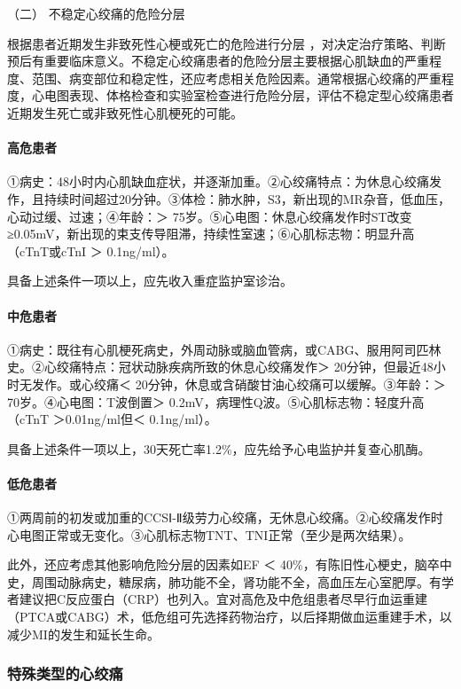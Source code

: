 \hypertarget{text00309.htmlux5cux23CHP10-7-2-5-2}{}
（二） 不稳定心绞痛的危险分层

根据患者近期发生非致死性心梗或死亡的危险进行分层
，对决定治疗策略、判断预后有重要临床意义。不稳定心绞痛患者的危险分层主要根据心肌缺血的严重程度、范围、病变部位和稳定性，还应考虑相关危险因素。通常根据心绞痛的严重程度，心电图表现、体格检查和实验室检查进行危险分层，评估不稳定型心绞痛患者近期发生死亡或非致死性心肌梗死的可能。

\paragraph{高危患者}

①病史：48小时内心肌缺血症状，并逐渐加重。②心绞痛特点：为休息心绞痛发作，且持续时间超过20分钟。③体检：肺水肿，S3，新出现的MR杂音，低血压，心动过缓、过速；④年龄：＞
75岁。⑤心电图：休息心绞痛发作时ST改变≥0.05mV，新出现的束支传导阻滞，持续性室速；⑥心肌标志物：明显升高（cTnT或cTnI
＞ 0.1ng/ml）。

具备上述条件一项以上，应先收入重症监护室诊治。

\paragraph{中危患者}

①病史：既往有心肌梗死病史，外周动脉或脑血管病，或CABG、服用阿司匹林史。②心绞痛特点：冠状动脉疾病所致的休息心绞痛发作＞
20分钟，但最近48小时无发作。或心绞痛＜
20分钟，休息或含硝酸甘油心绞痛可以缓解。③年龄：＞
70岁。④心电图：T波倒置＞ 0.2mV，病理性Q波。⑤心肌标志物：轻度升高（cTnT
＞0.01ng/ml但＜ 0.1ng/ml）。

具备上述条件一项以上，30天死亡率1.2\%，应先给予心电监护并复查心肌酶。

\paragraph{低危患者}

①两周前的初发或加重的CCSⅠ-Ⅱ级劳力心绞痛，无休息心绞痛。②心绞痛发作时心电图正常或无变化。③心肌标志物TNT、TNI正常（至少是两次结果）。

此外，还应考虑其他影响危险分层的因素如EF ＜
40\%，有陈旧性心梗史，脑卒中史，周围动脉病史，糖尿病，肺功能不全，肾功能不全，高血压左心室肥厚。有学者建议把C反应蛋白（CRP）也列入。宜对高危及中危组患者尽早行血运重建（PTCA或CABG）术，低危组可先选择药物治疗，以后择期做血运重建手术，以减少MI的发生和延长生命。

\subsubsection{特殊类型的心绞痛}

